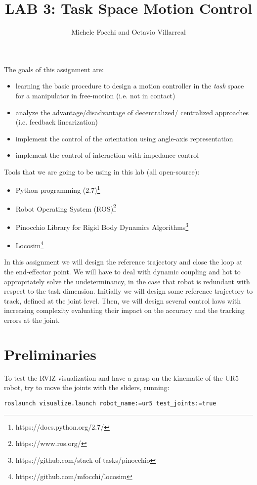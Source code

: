 \documentclass[11pt]{article}
\title{LAB 3: Task Space Motion Control}
\author{Michele Focchi and Octavio Villarreal}
\date{}
\begin{document}
	\maketitle
	\noindent
	The goals of this assignment are:
	\begin{itemize}
		\item learning the basic procedure to design a motion controller in the \textit{task} space for a manipulator in free-motion (i.e. not in contact)
		\item analyze the advantage/disadvantage of decentralized/ centralized approaches (i.e. feedback linearization)
		\item implement the control of the orientation using angle-axis representation
		\item implement the control of interaction with impedance control  
	\end{itemize}
	
	\noindent
	Tools that we are going to be using in this lab (all open-source):
	\begin{itemize}
		\item Python programming (2.7)\footnote{https://docs.python.org/2.7/}
		\item Robot Operating System (ROS)\footnote{https://www.ros.org/}
		\item Pinocchio Library for Rigid Body Dynamics Algorithms\footnote{https://github.com/stack-of-tasks/pinocchio}
		\item Locosim\footnote{https://github.com/mfocchi/locosim}
	\end{itemize}
	In this assignment we will design the reference trajectory and close the loop at the end-effector point. We will have to deal with dynamic coupling and 
	hot to appropriately solve the undeterminancy, in the case that robot is redundant with respect to the task dimension. Initially we will design some reference trajectory to track, defined at the joint level. Then, we will design several control laws with increasing complexity evaluating their impact on the accuracy and the tracking errors at the joint.

\section{Preliminaries}

To test the RVIZ visualization and have a grasp on the kinematic of the UR5 robot, try to move the joints with the sliders, running:
%
\begin{verbatim}
roslaunch visualize.launch robot_name:=ur5 test_joints:=true 
\end{verbatim}
\end{document}
